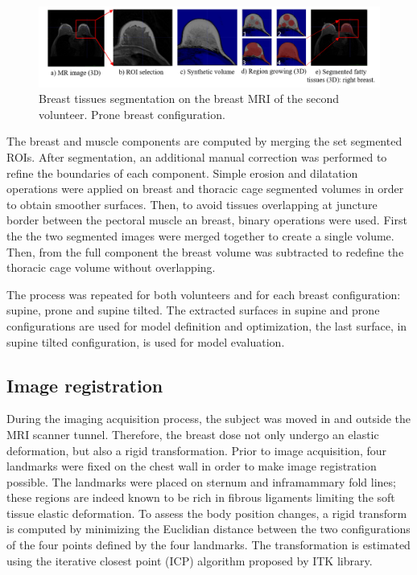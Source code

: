  
 \begin{figure}[h]
\centering
\includegraphics[width=1\textwidth,keepaspectratio]{figures/tissues_segmentation.png} 
\caption{Breast tissues segmentation on the breast MRI of the second volunteer. Prone breast configuration.} \label{fig:breasttissuessegmentation}
\end{figure}

The breast and muscle components are computed by merging the set segmented ROIs. After segmentation, an additional manual correction was performed to refine the boundaries of each component. Simple erosion and dilatation operations were applied on breast and thoracic cage segmented volumes in order to obtain smoother surfaces. Then, to avoid tissues overlapping at juncture border between the pectoral muscle an breast, binary operations were used. First the the two segmented images were merged together to create a single volume. Then, from the full component the breast volume was subtracted to redefine the thoracic cage volume without overlapping.
 
The process was repeated for both volunteers and for each breast configuration: supine, prone and supine tilted. The extracted surfaces in supine and prone configurations are used for model definition and optimization,  the last surface, in supine tilted configuration, is used for model evaluation. 

\subsection{Image registration}\label{subsection:image registration}

During the imaging acquisition process, the subject was moved in and outside the MRI scanner tunnel. Therefore, the breast dose not only undergo an elastic deformation, but also a rigid transformation. Prior to image acquisition, four landmarks were fixed on the chest wall in order to make image registration possible.  The landmarks were placed on sternum and inframammary fold lines; these regions are indeed known to be rich in fibrous ligaments limiting the soft tissue elastic deformation.  To assess the body position changes, a rigid transform is computed by minimizing the Euclidian distance between the two configurations of the four points defined by the four landmarks. The transformation is estimated using the iterative closest point (ICP) algorithm proposed by ITK library.

